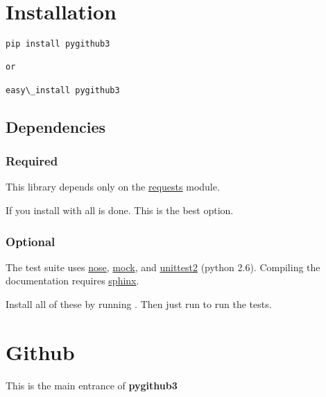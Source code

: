 \documentclass[letterpaper,10pt,english]{sphinxmanual}
\begin{document}
\section{Installation}
\label{installation:installation}\label{installation::doc}
\begin{Verbatim}[commandchars=\\\{\}]
pip install pygithub3

or

easy\_install pygithub3
\end{Verbatim}


\subsection{Dependencies}
\label{installation:dependencies}

\subsubsection{Required}
\label{installation:required}
This library depends only on the \href{http://docs.python-requests.org/en/v0.10.6/index.html}{requests} module.

If you install  with  all is done. This is the best option.


\subsubsection{Optional}
\label{installation:optional}
The test suite uses \href{http://readthedocs.org/docs/nose/en/latest}{nose}, \href{http://pypi.python.org/pypi/mock}{mock}, and \href{http://pypi.python.org/pypi/unittest2}{unittest2} (python 2.6). Compiling
the documentation requires \href{http://sphinx.pocoo.org/}{sphinx}.

Install all of these by running .  Then
just run  to run the tests.


\section{Github}
\label{github::doc}\label{github:github}\label{github:sphinx}
This is the main entrance of \textbf{pygithub3}
\end{document}
